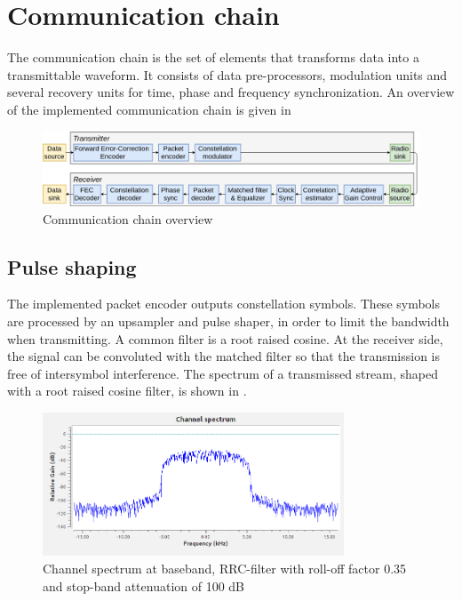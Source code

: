 \section{Communication chain}
The communication chain is the set of elements that transforms data into a transmittable waveform. It consists of data pre-processors, modulation units and several recovery units for time, phase and frequency synchronization. An overview of the implemented communication chain is given in 

\begin{figure}[H]
    \centering
    \includegraphics[width=1\textwidth]{img_commchain/overview.png}
    \caption{Communication chain overview}
    \label{fig:commchain_overview}
\end{figure}



\subsection{Pulse shaping}

The implemented packet encoder outputs constellation symbols. These symbols are processed by an upsampler and pulse shaper, in order to limit the bandwidth when transmitting. A common filter is a root raised cosine. At the receiver side, the signal can be convoluted with the matched filter so that the transmission is free of intersymbol interference. The spectrum of a transmissed stream, shaped with a root raised cosine filter, is shown in .

\begin{figure}[H]
    \centering
    \includegraphics[width=0.8\textwidth]{img_commchain/channel_spectrum.png}
    \caption{Channel spectrum at baseband, RRC-filter with roll-off factor 0.35 and stop-band attenuation of 100 dB}
    \label{fig:channel_spectrum}
\end{figure}





